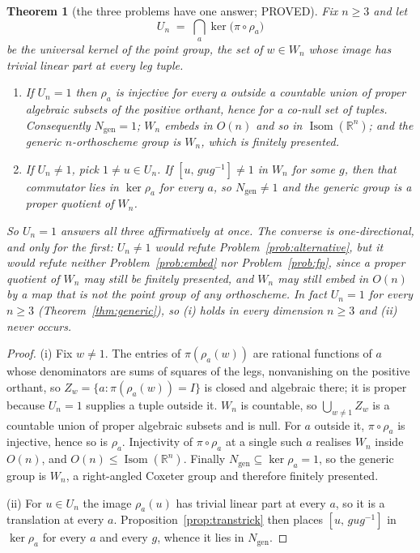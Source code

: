 \documentclass[11pt]{article}
\newtheorem{theorem}{Theorem}[section]
\theoremstyle{definition}
\theoremstyle{remark}
\theoremstyle{definition}
\newcommand{\R}{\mathbb{R}}
\newcommand{\Isom}{\operatorname{Isom}}
\begin{document}
\begin{theorem}[the three problems have one answer; PROVED]\label{thm:unify}
Fix $n\ge3$ and let
\[
   U_n \;=\; \bigcap_{a}\ker\bigl(\pi\circ\rho_a\bigr)
\]
be the universal kernel of the point group, the set of $w\in W_n$ whose image has trivial linear
part at \emph{every} leg tuple.
\begin{enumerate}[label=\textup{(\roman*)},leftmargin=2.4em]
\item If $U_n=1$ then $\rho_a$ is injective for every $a$ outside a countable union of proper
algebraic subsets of the positive orthant, hence for a co-null set of tuples. Consequently
$N_{\mathrm{gen}}=1$; $W_n$ embeds in $O(n)$ and so in $\Isom(\R^n)$; and the generic
$n$-orthoscheme group is $W_n$, which is finitely presented.
\item If $U_n\ne1$, pick $1\ne u\in U_n$. If $[u,\,gug^{-1}]\ne1$ in $W_n$ for some $g$, then that
commutator lies in $\ker\rho_a$ for \emph{every} $a$, so $N_{\mathrm{gen}}\ne1$ and the generic
group is a proper quotient of $W_n$.
\end{enumerate}
So $U_n=1$ answers all three affirmatively at once. The converse is one-directional, and only
for the first: $U_n\ne1$ would refute Problem~\textup{\ref{prob:alternative}}, but it would refute
neither Problem~\textup{\ref{prob:embed}} nor Problem~\textup{\ref{prob:fp}}, since a proper
quotient of $W_n$ may still be finitely presented, and $W_n$ may still embed in $O(n)$ by a map
that is not the point group of any orthoscheme. In fact $U_n=1$ for every $n\ge3$
\textup{(}Theorem~\textup{\ref{thm:generic})}, so \textup{(i)} holds in every dimension $n\ge3$
and \textup{(ii)} never occurs.
\end{theorem}

\begin{proof}
(i) Fix $w\ne1$. The entries of $\pi(\rho_a(w))$ are rational functions of $a$ whose denominators
are sums of squares of the legs, nonvanishing on the positive orthant, so
$Z_w=\{a:\pi(\rho_a(w))=I\}$ is closed and algebraic there; it is proper because $U_n=1$ supplies
a tuple outside it. $W_n$ is countable, so $\bigcup_{w\ne1}Z_w$ is a countable union of proper
algebraic subsets and is null. For $a$ outside it, $\pi\circ\rho_a$ is injective, hence so is
$\rho_a$. Injectivity of $\pi\circ\rho_a$ at a single such $a$ realises $W_n$ inside $O(n)$, and
$O(n)\le\Isom(\R^n)$. Finally $N_{\mathrm{gen}}\subseteq\ker\rho_a=1$, so the generic group is
$W_n$, a right-angled Coxeter group and therefore finitely presented.

(ii) For $u\in U_n$ the image $\rho_a(u)$ has trivial linear part at every $a$, so it is a
translation at every $a$. Proposition~\ref{prop:transtrick} then places $[u,\,gug^{-1}]$ in
$\ker\rho_a$ for every $a$ and every $g$, whence it lies in $N_{\mathrm{gen}}$.
\end{proof}
\end{document}
